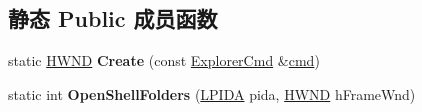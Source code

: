 \subsection*{静态 Public 成员函数}
\begin{DoxyCompactItemize}
\item 
\mbox{\label{struct_main_frame_base_ae0a2a65b1ffd0afee47105e01a3f77a1}} 
static \hyperlink{interfacevoid}{H\+W\+ND} {\bfseries Create} (const \hyperlink{struct_explorer_cmd}{Explorer\+Cmd} \&\hyperlink{structcmd}{cmd})
\item 
\mbox{\label{struct_main_frame_base_a92755f72360125fd310c55fa5c0926da}} 
static int {\bfseries Open\+Shell\+Folders} (\hyperlink{struct_c_i_d_a}{L\+P\+I\+DA} pida, \hyperlink{interfacevoid}{H\+W\+ND} h\+Frame\+Wnd)
\end{DoxyCompactItemize}
